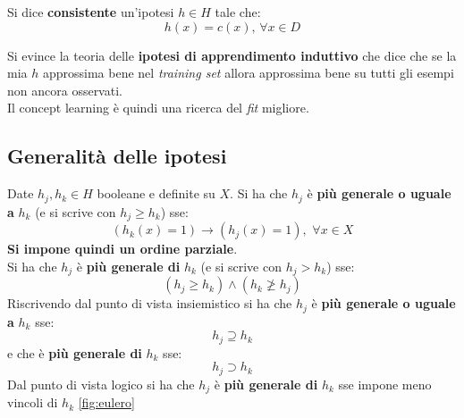 \begin{definizione}
 Si dice \textbf{consistente} un'ipotesi $h\in H$ tale che: 
\[h(x)=c(x),\,\forall x\in D\]  
\end{definizione}

Si evince la teoria delle \textbf{ipotesi di apprendimento induttivo} che dice che se la mia $h$ approssima bene nel \textit{training set} allora approssima bene su tutti gli esempi non ancora osservati.\\
Il concept learning è quindi una ricerca del \textit{fit} migliore.

\subsection{Generalità delle ipotesi}
\begin{definizione}
  Date $h_j,h_k\in H$ booleane e definite su $X$. Si ha che $h_j$ è \textbf{più
    generale o uguale a} $h_k$ (e si scrive con $h_j\geq h_k$) sse:
  \[(h_k(x)=1)\longrightarrow (h_j(x)=1),\,\,\forall x\in X\]
  \textbf{Si impone quindi un ordine parziale}.\\
  Si ha che $h_j$ è \textbf{più generale di} $h_k$ (e si scrive con $h_j> h_k$)
  sse:
  \[(h_j\geq h_k)\land (h_k\not\geq h_j)\]
  Riscrivendo dal punto di vista insiemistico si ha che $h_j$ è \textbf{più
    generale o uguale a} $h_k$ sse:
  \[h_j\supseteq h_k\]
  e che è \textbf{più generale di} $h_k$ sse:
  \[h_j\supset h_k\]
  Dal punto di vista logico si ha che $h_j$ è \textbf{più generale di} $h_k$ sse
  impone meno vincoli di $h_k$ \ref{fig:eulero}
\end{definizione}
